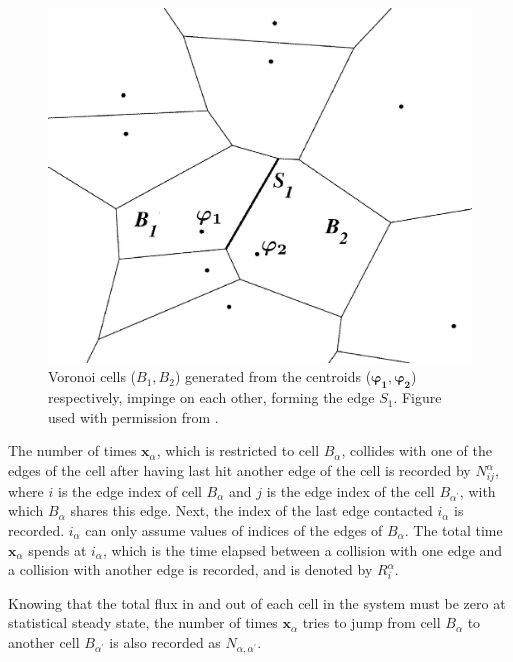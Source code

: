 \documentclass{article}
\begin{document}
\begin{figure}[htp]
\centering
\includegraphics[scale=1.2]{voronoi}
\caption{Voronoi cells ($B_1, B_2$) generated from the centroids ($\bm{\varphi_1}, \bm{\varphi_2}$) respectively, impinge on each other, forming the edge $S_1$. Figure used with permission from \cite{Vanden-Eijnden2009a}.}
 \label{fig:7}
\end{figure}

The number of times $\bm{x}_{\alpha}$, which is restricted to cell $B_{\alpha}$, collides with one of the edges of the cell after having last hit another edge of the cell is recorded by $N_{ij}^{\alpha}$, where $i$ is the edge index of cell $B_{\alpha}$ and $j$ is the edge index of the cell $B_{\alpha^{\prime}}$, with which $B_{\alpha}$ shares this edge. Next, the index of the last edge contacted $i_{\alpha}$ is recorded. $i_{\alpha}$ can only assume values of indices of the edges of $B_{\alpha}$. The total time $\bm{x}_{\alpha}$ spends at $i_{\alpha}$, which is the time elapsed between a collision with one edge and a collision with another edge is recorded, and is denoted by $R_i^{\alpha}$.

Knowing that the total flux in and out of each cell in the system must be zero at statistical steady state, the number of times $\bm{x}_{\alpha}$ tries to jump from cell $B_{\alpha}$ to another cell $B_{\alpha^{\prime}}$ is also recorded as $N_{\alpha, \alpha^{\prime}}$.  \\
\end{document}
